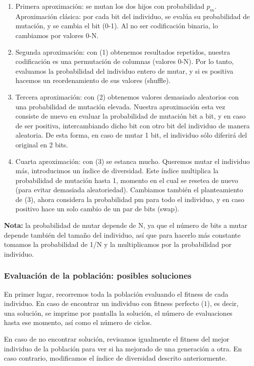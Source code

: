 \documentclass[12pt]{article}
\begin{document}
\begin{enumerate}
    \item Primera aproximación: se mutan los dos hijos con probabilidad $p_m$. Aproximación clásica: por cada bit del individuo, se evalúa su probabilidad de mutación, y se cambia el bit (0-1). Al no ser codificación binaria, lo cambiamos por valores 0-N.
    \item Segunda aproximación: con (1) obtenemos resultados repetidos, nuestra codificación es una permutación de columnas (valores 0-N). Por lo tanto, evaluamos la probabilidad del individuo entero de mutar, y si es positiva hacemos un reordenamiento de sus valores (shuffle).
    \item Tercera aproximación: con (2) obtenemos valores demasiado aleatorios con una probabilidad de mutación elevada. Nuestra aproximación esta vez consiste de nuevo en evaluar la probabilidad de mutación bit a bit, y en caso de ser positiva, intercambiando dicho bit con otro bit del individuo de manera aleatoria. De esta forma, en caso de mutar 1 bit, el individuo sólo diferirá del original en 2 bits.
    \item Cuarta aproximación: con (3) se estanca mucho. Queremos mutar el individuo más, introducimos un índice de diversidad. Este índice multiplica la probabilidad de mutación hasta 1, momento en el cual se resetea de nuevo (para evitar demasiada aleatoriedad). Cambiamos también el planteamiento de (3), ahora considera la probabilidad pm para todo el individuo, y en caso positivo hace un solo cambio de un par de bits (swap).
    
\end{enumerate}
\textbf{Nota:}
la probabilidad de mutar depende de N, ya que el número de bits a mutar depende también del tamaño del individuo, así que para hacerlo más constante tomamos la probabilidad de 1/N y la multiplicamos por la probabilidad por individuo.


\subsubsection{Evaluación de la población: posibles soluciones}
En primer lugar, recorremos toda la población evaluando el fitness de cada individuo. En caso de encontrar un individuo con fitness perfecto ($1$), es decir, una solución, se imprime por pantalla la solución, el número de evaluaciones hasta ese momento, así como el número de ciclos.

En caso de no encontrar solución, revisamos igualmente el fitness del mejor individuo de la población para ver si ha mejorado de una generación a otra. En caso contrario, modificamos el índice de diversidad descrito anteriormente.
\end{document}
